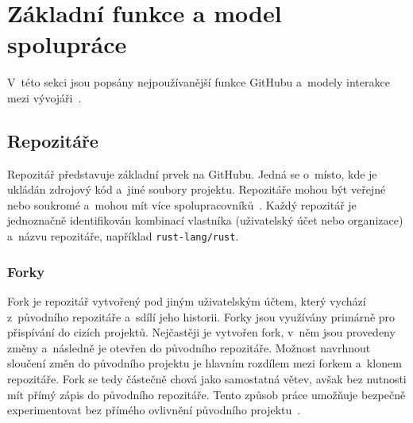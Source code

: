 
\section{Základní funkce a model spolupráce}
\label{sec:github:zakladni_funkce_model_spoluprace}
V~této sekci jsou popsány nejpoužívanější funkce GitHubu a~modely interakce mezi vývojáři~\cite{github_docs}.

\subsection{Repozitáře}
\label{subsec:github:repozitare}
Repozitář představuje základní prvek na GitHubu. Jedná se o~místo, kde je ukládán zdrojový kód a~jiné soubory projektu. Repozitáře mohou být veřejné nebo soukromé a~mohou mít více spolupracovníků~\cite{github_docs}. Každý repozitář je jednoznačně identifikován kombinací vlastníka (uživatelský účet nebo organizace) a~názvu repozitáře, například \texttt{rust-lang/rust}.

\subsubsection*{Forky}
\label{subsubsec:github:forky}
Fork je repozitář vytvořený pod jiným uživatelským účtem, který vychází z~původního repozitáře a~sdílí jeho historii. Forky jsou využívány primárně pro přispívání do cizích projektů. Nejčastěji je vytvořen fork, v~něm jsou provedeny změny a~následně je otevřen \PR do původního repozitáře. Možnost navrhnout sloučení změn do původního projektu je hlavním rozdílem mezi forkem a~klonem repozitáře. Fork se tedy částečně chová jako samostatná větev, avšak bez nutnosti mít přímý zápis do původního repozitáře. Tento způsob práce umožňuje bezpečně experimentovat bez přímého ovlivnění původního projektu~\cite{github_pull_requests_docs}.

